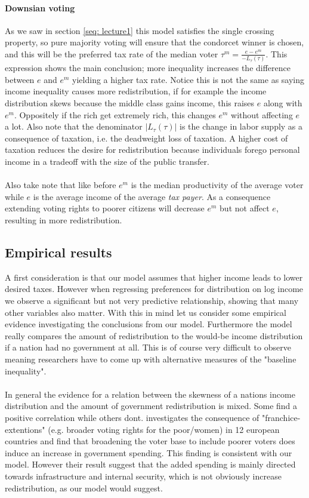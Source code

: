 \paragraph{Downsian voting} As we saw in section \ref{seq: lecture1} this model satisfies the single crossing property, so pure majority voting will ensure that the condorcet winner is chosen, and this will be the preferred tax rate of the median voter $\tau^m=\frac{e-e^m}{-L_{\tau}(\tau)}$. This expression shows the main conclusion; more inequality increases the difference between $e$ and $e^m$ yielding a higher tax rate. Notice this is not the same as saying income inequality causes more redistribution, if for example the income distribution skews because the middle class gains income, this raises $e$ along with $e^m$. Oppositely if the rich get extremely rich, this changes $e^m$ without affecting $e$ a lot. Also note that the denominator $|L_{\tau}(\tau)|$ is the change in labor supply as a consequence of taxation, i.e. the deadweight loss of taxation. A higher cost of taxation reduces the desire for redistribution because individuals forego personal income in a tradeoff with the size of the public transfer. 
\\ \\ 
Also take note that like before $e^m$ is the median productivity of the average voter while $e$ is the average income of the average \emph{tax payer}. As a consequence extending voting rights to poorer citizens will decrease $e^m$ but not affect $e$, resulting in more redistribution.

\subsection{Empirical results}
A first consideration is that our model assumes that higher income leads to lower desired taxes. However when regressing preferences for distribution on log income we observe a significant but not very predictive relationship, showing that many other variables also matter. With this in mind let us consider some empirical evidence investigating the conclusions from our model. Furthermore the model really compares the amount of redistribution to the would-be income distribution if a nation had no government at all. This is of course very difficult to observe meaning researchers have to come up with alternative measures of the "baseline inequality". 
\\ \\ 
In general the evidence for a relation between the skewness of a nations income distribution and the amount of government redistribution is mixed. Some find a positive correlation while others dont. \cite{aidt_democracy_2006} investigates the consequence of "franchice-extentions" (e.g. broader voting rights for the poor/women) in 12 european countries and find that broadening the voter base to include poorer voters does induce an increase in government spending. This finding is consistent with our model. However their result suggest that the added spending is mainly directed towards infrastructure and internal security, which is not obviously increase redistribution, as our model would suggest. 

